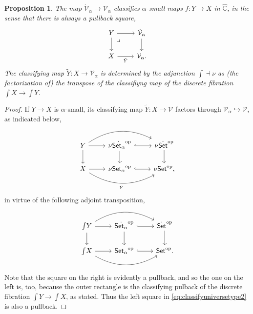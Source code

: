 \documentclass[12pt]{article}
\newcommand{\bbC}{\ensuremath{\mathbb{C}}}
\newcommand{\Set}{\ensuremath{\mathsf{Set}}}
\newcommand{\op}[1]{\ensuremath{{#1}^{\mathrm{op}}}}
\newcommand{\hook}{\ensuremath{\hookrightarrow}}
\renewcommand{\to}{\ensuremath{\rightarrow}}
\newcommand{\V}{\ensuremath{\mathcal{V}}}
\newcommand{\VV}{\ensuremath{\dot{\mathcal{V}}}}
\newcommand{\elem}[1]{\textstyle\int\!{#1}}
\newtheorem{proposition}[theorem]{Proposition}
\theoremstyle{remark}
\theoremstyle{definition}
\newcommand{\pbmark}{\ar[dr, phantom, "\lrcorner" very near start, shift right=.5ex]}	%
\begin{document}
 \begin{proposition}\label{prop:familyclassifier}
The map $\VV_\alpha\to\V_\alpha$ classifies $\alpha$-small maps $f:Y\to X$ in $\widehat{\bbC}$, in the sense that there is always a pullback square,
\begin{equation}\label{eq:classifyuniversefamilyalpha}\textstyle
\begin{tikzcd}
	 Y \ar[d] \pbmark \ar[r] & \VV_\alpha \ar[d] \\  
	X \ar[r,swap, "\tilde{Y}"] &  \V_\alpha.
 \end{tikzcd}
 \end{equation}
The classifying map $\tilde{Y} : X\to \V_\alpha$ is determined by the adjunction $\int \dashv \nu$ as (the factorization of) the transpose of the classifiyng map of the discrete fibration $\elem X\to\elem Y$. 
\end{proposition}

\begin{proof} If $Y\to X$ is $\alpha$-small, its classifying map $\tilde{Y} : X\to\V$ factors through $\V_\alpha \hook \V$, as indicated below, 
\begin{equation}\label{eq:classifyuniversetype2}\textstyle
\begin{tikzcd}
	 Y \ar[d] \ar[rr, bend left] \ar[r] & \nu\op{\dot{\Set_\alpha}} \ar[d] \ar[r,hook] & \nu\op{\dot{\Set}} \ar[d]\\  
	X \ar[rr, bend right, swap,"\tilde{Y}"] \ar[r] &  \nu\op{\Set_\alpha} \ar[r,hook] &  \nu\op{\Set},
 \end{tikzcd}
 \end{equation}
%
in virtue of the following adjoint transposition,
\begin{equation}\label{eq:adjointtranspose}\textstyle
\begin{tikzcd}
	 \elem Y \ar[d] \ar[rr, bend left] \ar[r] & \op{\dot{\Set_\alpha}} \ar[d] \ar[r,hook] & \op{\dot{\Set}} \ar[d]\\  
	 \elem X \ar[rr, bend right, ] \ar[r]  &  \op{\Set_\alpha} \ar[r,hook]  &  \op{\Set}.
 \end{tikzcd}
  \end{equation}
Note that the square on the right is evidently a pullback, and so the one on the left is, too, because the outer rectangle is the classifying pulback of the discrete fibration $\elem Y \to \elem X$, as stated.  Thus the left square in \eqref{eq:classifyuniversetype2} is also a pullback.
\end{proof}

\end{document}
